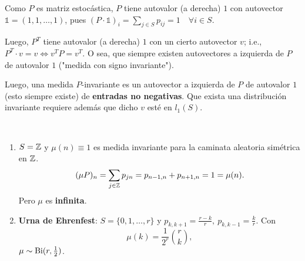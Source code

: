 \begin{remark}
	Como $P$ es matriz estocástica, $P$ tiene autovalor (a derecha) $1$ con autovector $\mathds{1} = (1,1,\dots,1)$, pues $(P \cdot \mathds{1})_{i} = \sum_{j \in S} p_{ij} = 1 \quad \forall i \in S$. \par
	Luego, $P^{T}$ tiene autovalor (a derecha) $1$ con un cierto autovector $v$; i.e., $P^{T} \cdot v = v \iff v^{T} P = v^{T}$. O sea, que siempre existen autovectores a izquierda de $P$ de autovalor $1$ ("medida con signo invariante"). \par
	Luego, una medida $P$-invariante es un autovector a izquierda de $P$ de autovalor $1$ (esto siempre existe) de \textbf{entradas no negativas}. Que exista una distribución invariante requiere además que dicho $v$ esté en $l_{1}(S)$.
\end{remark}

\begin{eg}~
	\begin{enumerate}
		\item $S = \mathbb{Z}$ y $\mu(n) \equiv 1$ es medida invariante para la caminata aleatoria simétrica en $\mathbb{Z}$.
		\[ (\mu P)_{n} = \sum_{j \in \mathbb{Z}} p_{jn} = p_{n-1,n} + p_{n+1, n} = 1 = \mu(n). \]
		Pero $\mu$ es \textbf{infinita}.

		\item \textbf{Urna de Ehrenfest}: $S = \{0,1,\dots,r\}$ y $p_{k,k+1} = \frac{r-k}{r},\ p_{k,k-1} = \frac{k}{r}$. Con
		\[ \mu(k) = \frac{1}{2^{r}} \binom{r}{k}, \]
		$\mu \sim \operatorname{Bi}(r, \frac{1}{2})$.
	\end{enumerate}
\end{eg}
